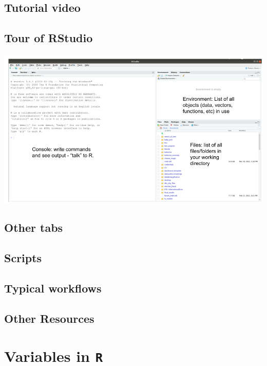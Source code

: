 \documentclass[
]{book}
\begin{document}
\hypertarget{tutorial-video-1}{%
\section*{Tutorial video}\label{tutorial-video-1}}

\hypertarget{tour-of-rstudio}{%
\section{Tour of RStudio}\label{tour-of-rstudio}}

\includegraphics{img/rstudio_windows.png}

\hypertarget{other-tabs}{%
\section{Other tabs}\label{other-tabs}}

\hypertarget{scripts}{%
\section{Scripts}\label{scripts}}

\hypertarget{typical-workflows}{%
\section{Typical workflows}\label{typical-workflows}}

\hypertarget{other-resources-1}{%
\section{Other Resources}\label{other-resources-1}}

\hypertarget{variables-in-r}{%
\chapter{\texorpdfstring{Variables in \texttt{R}}{Variables in R}}\label{variables-in-r}}
\end{document}

